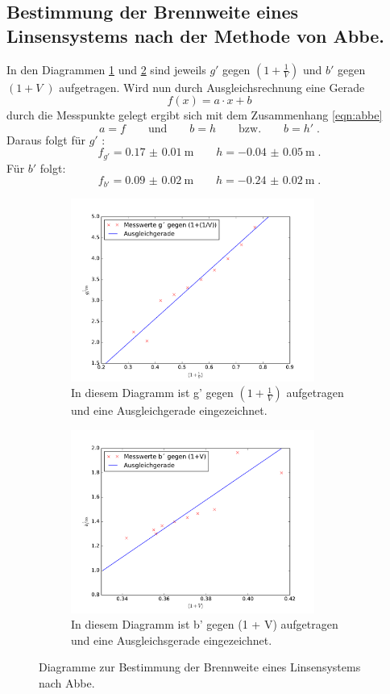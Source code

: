 \subsection{Bestimmung der Brennweite eines Linsensystems nach der Methode von Abbe.}
In den Diagrammen \ref{fig:gabbe} und \ref{fig:babbe} sind jeweils
$g'$ gegen $\left(1 + \frac{1}{V}\right)$ und $b'$ gegen $ \left(1 + V\; \right)$
aufgetragen. Wird nun durch Ausgleichsrechnung eine Gerade
\begin{equation*}
  f(x) = a \cdot x + b
\end{equation*}
durch die Messpunkte gelegt ergibt sich mit dem Zusammenhang \eqref{eqn:abbe}
\begin{equation*}
  a = f \qquad \text{und} \qquad b = h \qquad \text{bzw.} \qquad b = h' \; .
\end{equation*}
Daraus folgt für $g'$ :
\begin{equation*}
  f_{g'} = \SI{0.17(1)}{\meter} \qquad h = \SI{-0.04(5)}{\meter} \;.
\end{equation*}
Für $b'$ folgt:
\begin{equation*}
  f_{b'} = \SI{0.09(2)}{\meter} \qquad h = \SI{-0.24(2)}{\meter} \;.
\end{equation*}
\begin{figure}
  \centering
    \begin{subfigure}{0.48\textwidth}
      \includegraphics[height = 6cm]{plots/gsplot.pdf}
      \caption{In diesem Diagramm ist g' gegen
      \texorpdfstring{$\left(1 + \frac{1}{V}\right)$}{math} aufgetragen und
      eine Ausgleichgerade eingezeichnet. }
      \label{fig:gabbe}
    \end{subfigure}
    \begin{subfigure}{0.48\textwidth}
      \includegraphics[height = 6cm]{plots/bsplot.pdf}
      \caption{In diesem Diagramm ist b' gegen (1 + V) aufgetragen und
      eine Ausgleichsgerade eingezeichnet. }
      \label{fig:babbe}
    \end{subfigure}
    \caption{Diagramme zur Bestimmung der Brennweite eines Linsensystems nach Abbe.}
    \label{fig:abbe}
\end{figure}
